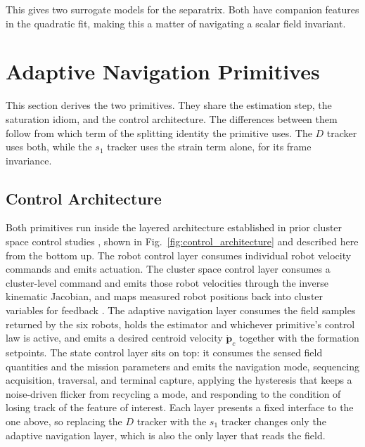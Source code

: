 \documentclass[lettersize,journal]{IEEEtran}
\begin{document}
This gives two surrogate models for the separatrix. Both have companion
features in the quadratic fit, making this a matter of navigating a
scalar field invariant.

\section{Adaptive Navigation Primitives}
\label{sec:controllers}

This section derives the two primitives. They share the estimation
step, the saturation idiom, and the control architecture.
The differences between them follow from which term of the splitting
identity the primitive uses. The $D$ tracker uses both, while
the $s_1$ tracker uses the strain term alone, for its frame invariance.

\subsection{Control Architecture}
\label{sec:arch}

Both primitives run inside the layered architecture established in
prior cluster space control studies \cite{8,31}, shown in
Fig.~\ref{fig:control_architecture} and described here from the bottom
up. The robot control layer consumes individual robot velocity
commands and emits actuation. The cluster space control layer consumes
a cluster-level command and emits those robot velocities through the
inverse kinematic Jacobian, and maps measured robot positions back
into cluster variables for feedback \cite{31,32}. The adaptive
navigation layer consumes the field samples returned by the six
robots, holds the estimator and
whichever primitive's control law is active, and emits a desired
centroid velocity $\dot{\mathbf{p}}_c$ together with the formation
setpoints. The state control layer sits on top: it consumes the sensed
field quantities and the mission parameters and emits the navigation
mode, sequencing acquisition, traversal, and terminal capture,
applying the hysteresis that keeps a noise-driven flicker from
recycling a mode, and responding to the condition of losing track of
the feature of interest. Each layer presents a fixed interface to the
one above, so replacing the $D$ tracker with the $s_1$ tracker changes
only the adaptive navigation layer, which is also the only layer that
reads the field.
\end{document}
